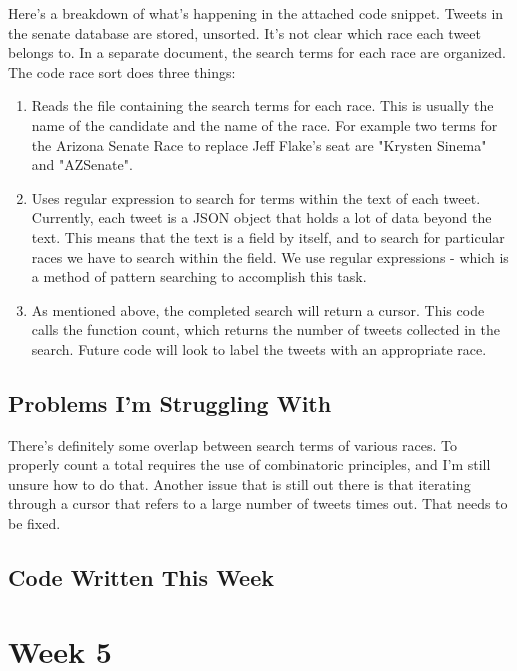 \documentclass[11pt, twoside, reqno]{article}
\begin{document}
Here's a breakdown of what's happening in the attached code snippet. Tweets in the senate database are stored, unsorted. It's not clear which race each tweet belongs to. In a separate document, the search terms for each race are organized. The code race sort does three things:
\begin{enumerate}
	\item Reads the file containing the search terms for each race. This is usually the name of the candidate and the name of the race. For example two terms for the Arizona Senate Race to replace Jeff Flake's seat are "Krysten Sinema" and "AZSenate". 
	\item Uses regular expression to search for terms within the text of each tweet. Currently, each tweet is a JSON object that holds a lot of data beyond the text. This means that the text is a field by itself, and to search for particular races we have to search within the field. We use regular expressions - which is a method of pattern searching to accomplish this task. 
	\item As mentioned above, the completed search will return a cursor. This code calls the function count, which returns the number of tweets collected in the search. Future code will look to label the tweets with an appropriate race. 
\end{enumerate}

\subsection{Problems I'm Struggling With}
There's definitely some overlap between search terms of various races. To properly count a total requires the use of combinatoric principles, and I'm still unsure how to do that. Another issue that is still out there is that iterating through a cursor that refers to a large number of tweets times out. That needs to be fixed. 

\subsection{Code Written This Week}


\newpage

\section{Week 5}
\end{document}
